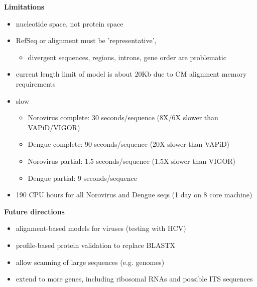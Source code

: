 \documentclass[landscape]{slides}
\begin{document}
\begin{slide}
\begin{center}
\textbf{Limitations}
\end{center}

\small
\begin{itemize}
\item nucleotide space, not protein space
\item RefSeq or alignment must be 'representative',
  \begin{itemize}
    \item divergent sequences, regions, introns, gene order are problematic
  \end{itemize}
\item current length limit of model is about 20Kb due to CM alignment memory
  requirements
\item slow
  \begin{itemize}
  \item Norovirus complete: 30 seconds/sequence (8X/6X slower than
    VAPiD/VIGOR)
  \item Dengue complete: 90 seconds/sequence (20X slower than VAPiD)
  \item Norovirus partial: 1.5 seconds/sequence (1.5X slower than VIGOR)
  \item Dengue partial: 9 seconds/sequence
  \end{itemize}
\item 190 CPU hours for all Norovirus and Dengue seqs (1 day on
8 core machine)
\end{itemize}

\vfill
\end{slide}
\begin{slide}
\begin{center}
\textbf{Future directions}
\end{center}

\small
\begin{itemize}
\item alignment-based models for viruses (testing with HCV)
\item profile-based protein validation to replace BLASTX
\item allow scanning of large sequences (e.g. genomes)
\item extend to more genes, including ribosomal RNAs and possible ITS
  sequences 
\end{itemize}

\vfill
\end{slide}
\end{document}
